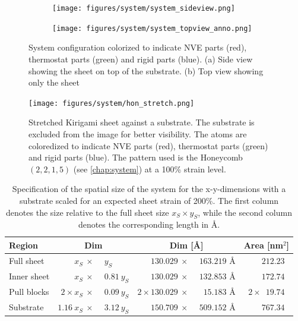 \begin{figure}[h]
  \centering
  \begin{subfigure}[b]{0.60\textwidth}
      \centering
      \texttt{[image: figures/system/system\_sideview.png]}
      \caption{}
      \label{fig:sideview}
  \end{subfigure}
  \hfill
  \begin{subfigure}[b]{0.60\textwidth}
      \centering
      \texttt{[image: figures/system/system\_topview\_anno.png]}
      \caption{}
      \label{fig:topview}
  \end{subfigure}
  \hfill
     \caption{System configuration colorized to indicate NVE parts (red), thermostat parts (green) and rigid parts (blue). (a) Side view showing the sheet on top of the substrate. (b) Top view showing only the sheet}
     \label{fig:system}
\end{figure}


\begin{figure}[h]
  \centering
  \texttt{[image: figures/system/hon\_stretch.png]}
  \caption{Stretched Kirigami sheet against a substrate. The substrate is excluded from the image for better visibility. The atoms are coloredized to indicate NVE parts (red), thermostat parts (green) and rigid parts (blue). The pattern used is the Honeycomb $(2,2,1,5)$ (see \cref{chap:system}) at a 100\% strain level.}
  \label{fig:kirigami_stretch}
\end{figure}


\begin{table}[h]
  \begin{center}
  \caption{Specification of the spatial size of the system for the x-y-dimensions with a substrate scaled for an expected sheet strain of 200\%. The first column denotes the size relative to the full sheet size $x_S \times y_S$, while the second column denotes the corresponding length in Å.}
  \label{tab:sheet_dim}
  \begin{tabular}{ | l | r@{}l | r@{}l | c |} \hline
    \textbf{Region} & \multicolumn{2}{c|}{Dim} & \multicolumn{2}{c|}{Dim
    [Å]} & Area [nm$^2$]\\ \hline
  Full sheet & $x_S \: \times \: $ & $y_S$ &  $130.029 \: \times \:$ & $163.219$ Å & $\phantom{2\times} 212.23$ \\ \hline
  Inner sheet & $x_S \: \times \:$ & $0.81 \ y_S$ &  $130.029  \: \times \:$ & $132.853$ Å & $\phantom{2\times} 172.74$\\ \hline
  Pull blocks & $2 \times x_S \: \times \:$ & $ 0.09 \ y_S$ & $2 \times 130.029  \: \times \: $ & $\phantom{0}15.183$ Å  & $2 \times \phantom{0}19.74$ \\ \hline  
  Substrate & $1.16 \ x_S \: \times \:$ & $3.12 \ y_S$ &  $150.709  \: \times \:$ & $509.152$ Å & $\phantom{2\times} 767.34$\\ \hline
\end{tabular}
\end{center}
\end{table}



